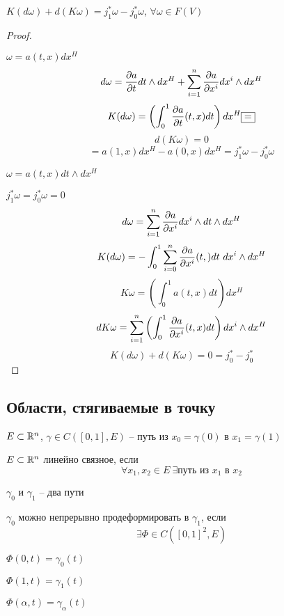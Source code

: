     \begin{lemma}
        $K(d \omega) + d(K\omega) = j_1^*\omega - j_0^*\omega$, \quad $\forall \omega \in F(V)$
    \end{lemma}
    \begin{proof}
        $ $
        \item $\omega = a(t, x) dx^H$
            \[
                d\omega = \frac{\partial a}{\partial t} dt \wedge dx^H + \sum_{i=1}^n \frac{\partial a}{\partial x^i} dx^i \wedge dx^H
            \]
            \[
                K(d\omega) = \left( \int_0^1 \frac{\partial a}{\partial t}(t, x) dt \right) dx^H \boxed{=}
            \]
            \[
                d(K\omega) = 0    
            \]
            \[
                \boxed{=} a(1, x) dx^H - a(0, x)dx^H = j^*_1 \omega - j^*_0 \omega
            \]
        \item $\omega = a(t, x)dt \wedge dx^H$
            \par $j^*_1 \omega = j^*_0 \omega = 0$
            \[
                d \omega = \sum_{i=1}^n \frac{\partial a}{\partial x^i} dx^i \wedge dt \wedge dx^H   
            \]
            \[
                K(d\omega) = - \int_0^1 \sum_{i=0}^n \frac{\partial a}{\partial x^i}(t, ) dt \ dx^i \wedge dx^H   
            \]
            \[
                K\omega = \left( \int_0^1 a(t, x)dt \right) dx^H  
            \]
            \[
                dK\omega = \sum_{i=1}^n \left( \int_0^1 \frac{\partial a}{\partial x^i}(t, x) dt \right) dx^i \wedge dx^H   
            \]
            \[
                K(d\omega) + d(K\omega) = 0 = j^*_0 - j^*_0    
            \]
    \end{proof}

    \subsection*{Области, стягиваемые в точку}

    \par $E \subset \mathbb{R}^n$, $\gamma \in C([0, 1], E)$ -- путь из $x_0 = \gamma(0)$ в $x_1 = \gamma(1)$
    \begin{definition}
        $E \subset \mathbb{R}^n$ линейно связное, если
        \[
            \forall x_1, x_2 \in E \ \exists \text{путь из } x_1 \text{ в } x_2    
        \]
    \end{definition}

    \begin{definition}
        $\gamma_0$ и $\gamma_1$ -- два пути
        \par $\gamma_0$ можно непрерывно продеформировать в $\gamma_1$, если
        \[
            \exists \Phi \in C([0,1]^2, E)    
        \]
        \par $\Phi(0, t) = \gamma_0(t)$
        \par $\Phi(1, t) = \gamma_1(t)$
        \par $\Phi(\alpha, t) = \gamma_\alpha(t)$
    \end{definition}

